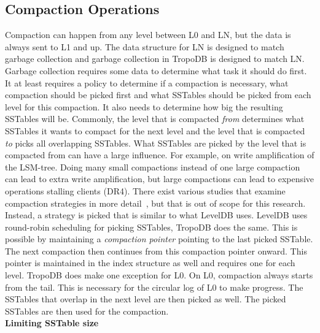 \subsection{Compaction Operations}
\label{sec:compact}
Compaction can happen from any level between L0 and LN, but the data is always sent to L1 and up. The data structure for LN is designed to match garbage collection and garbage collection in TropoDB is designed to match LN. Garbage collection requires some data to determine what task it should do first. It at least requires a policy to determine if a compaction is necessary, what compaction should be picked first and what SSTables should be picked from each level for this compaction. It also needs to determine how big the resulting SSTables will be. Commonly, the level that is compacted \textit{from} determines what SSTables it wants to compact for the next level and the level that is compacted \textit{to} picks all overlapping SSTables. What SSTables are picked by the level that is compacted from can have a large influence. For example, on write amplification of the LSM-tree. Doing many small compactions instead of one large compaction can lead to extra write amplification, but large compactions can lead to expensive operations stalling clients (DR4). There exist various studies that examine compaction strategies in more detail~\cite{balmau2019silk, balmau2017triad, pan2017dcompaction, mei2018sifrdb}, but that is out of scope for this research. Instead, a strategy is picked that is similar to what LevelDB uses. LevelDB uses round-robin scheduling for picking SSTables, TropoDB does the same. This is possible by maintaining a \textit{compaction pointer} pointing to the last picked SSTable. The next compaction then continues from this compaction pointer onward. This pointer is maintained in the index structure as well and requires one for each level. TropoDB does make one exception for L0. On L0, compaction always starts from the tail. This is necessary for the circular log of L0 to make progress. The SSTables that overlap in the next level are then picked as well. The picked SSTables are then used for the compaction.\\
\textbf{Limiting SSTable size}\\
